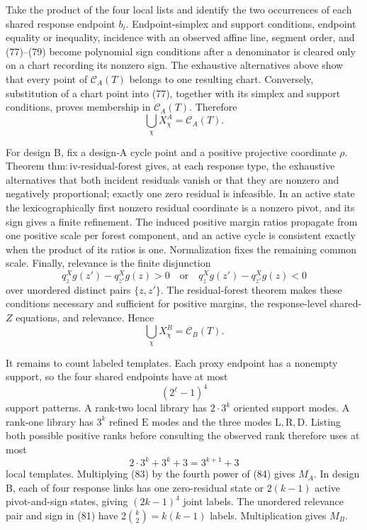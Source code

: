 Take the product of the four local lists and identify the two occurrences of each shared response endpoint \(b_i\).  Endpoint-simplex and support conditions, endpoint equality or inequality, incidence with an observed affine line, segment order, and (77)--(79) become polynomial sign conditions after a denominator is cleared only on a chart recording its nonzero sign.  The exhaustive alternatives above show that every point of \(\mathcal C_A(T)\) belongs to one resulting chart.  Conversely, substitution of a chart point into (77), together with its simplex and support conditions, proves membership in \(\mathcal C_A(T)\).  Therefore
\[
 \bigcup_{\chi}X^A_{\chi}=\mathcal C_A(T).               \tag{80}
\]

For design B, fix a design-A cycle point and a positive projective coordinate \(\rho\).  Theorem \(\mathrm{thm{:}iv\text{-}residual\text{-}forest}\) gives, at each response type, the exhaustive alternatives that both incident residuals vanish or that they are nonzero and negatively proportional; exactly one zero residual is infeasible.  In an active state the lexicographically first nonzero residual coordinate is a nonzero pivot, and its sign gives a finite refinement.  The induced positive margin ratios propagate from one positive scale per forest component, and an active cycle is consistent exactly when the product of its ratios is one.  Normalization fixes the remaining common scale.  Finally, relevance is the finite disjunction
\[
 q^X_zg(z')-q^X_{z'}g(z)>0
 \quad\text{or}\quad
 q^X_zg(z')-q^X_{z'}g(z)<0                               \tag{81}
\]
over unordered distinct pairs \(\{z,z'\}\).  The residual-forest theorem makes these conditions necessary and sufficient for positive margins, the response-level shared-\(Z\) equations, and relevance.  Hence
\[
 \bigcup_{\chi}X^B_{\chi}=\mathcal C_B(T).               \tag{82}
\]

It remains to count labeled templates.  Each proxy endpoint has a nonempty support, so the four shared endpoints have at most
\[
 (2^{\ell}-1)^4                                           \tag{83}
\]
support patterns.  A rank-two local library has \(2\cdot3^k\) oriented support modes.  A rank-one library has \(3^k\) refined \(\mathrm E\) modes and the three modes \(\mathrm L,\mathrm R,\mathrm D\).  Listing both possible positive ranks before consulting the observed rank therefore uses at most
\[
 2\cdot3^k+3^k+3=3^{k+1}+3                               \tag{84}
\]
local templates.  Multiplying (83) by the fourth power of (84) gives \(M_A\).  In design B, each of four response links has one zero-residual state or \(2(k-1)\) active pivot-and-sign states, giving \((2k-1)^4\) joint labels.  The unordered relevance pair and sign in (81) have \(2\binom{k}{2}=k(k-1)\) labels.  Multiplication gives \(M_B\).

